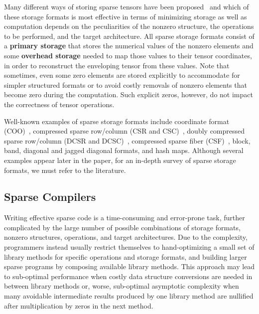 \documentclass[10pt]{article}
\begin{document}
Many different ways of storing sparse tensors have been proposed~\cite{sato1963,tinney,buluc2008,itpack,rice1985,saad2003,buluc2009,smith2015a,li2018hicoo} and which of these storage formats is most effective in terms of minimizing storage as well as computation depends on the peculiarities of the nonzero structure, the operations to be performed, and the target architecture. All sparse storage formats consist of a \textbf{primary storage} that stores the numerical values of the nonzero elements and some \textbf{overhead storage} needed to map those values to their tensor coordinates, in order to reconstruct the enveloping tensor from these values. Note that sometimes, even some zero elements are stored explicitly to accommodate for simpler structured formats or to avoid costly removals of nonzero elements that become zero during the computation. Such explicit zeros, however, do not impact the correctness of tensor operations.

Well-known examples of sparse storage formats include coordinate format (COO)~\cite{sato1963}, compressed sparse row/column (CSR and CSC)~\cite{tinney}, doubly compressed sparse row/column (DCSR and DCSC)~\cite{buluc2008}, compressed sparse fiber (CSF)~\cite{smith2015a}, block, band, diagonal and jagged diagonal formats, and hash maps. Although several examples appear later in the paper, for an in-depth survey of sparse storage formats, we must refer to the literature. 

\subsection{Sparse Compilers}

Writing effective sparse code is a time-consuming and error-prone task, further complicated by the large number of possible combinations of storage formats, nonzero structures, operations, and target architectures. Due to the complexity, programmers instead usually restrict themselves to hand-optimizing a small set of library methods for specific operations and storage formats, and building larger sparse programs by composing available library methods. This approach may lead to sub-optimal performance when costly data structure conversions are needed in between library methods or, worse, sub-optimal asymptotic complexity when many avoidable intermediate results produced by one library method are nullified after multiplication by zeros in the next method.
\end{document}
